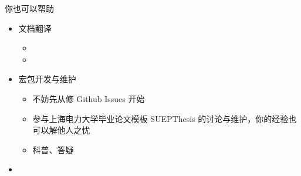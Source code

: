 \begin{frame}{你也可以帮助}

  \begin{itemize}
    \item<+-> 文档翻译
  
      \begin{itemize}
        \item {} 
        \item {} 
      \end{itemize}
  
    \item<+-> 宏包开发与维护
  
      \begin{itemize}
        \item 不妨先从修 Github Issues 开始
        \item 参与上海电力大学毕业论文模板 SUEPThesis  的讨论与维护，你的经验也可以解他人之忧
        \item 科普、答疑
      \end{itemize}
  
    \item<+-> 
  \end{itemize}
\end{frame}


